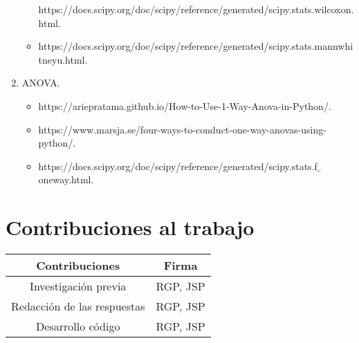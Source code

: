 \documentclass[12pt]{article}
\providecommand{\tightlist}{%
  \setlength{\itemsep}{0pt}\setlength{\parskip}{0pt}}
\begin{document}
\begin{enumerate}
\begin{itemize}
  \text https://docs.scipy.org/doc/scipy/reference/generated/scipy.stats.wilcoxon.html.\\ 
 \item
  \text https://docs.scipy.org/doc/scipy/reference/generated/scipy.stats.mannwhitneyu.html.\\ 
\end{itemize}
\item
ANOVA.\\
\begin{itemize}
\tightlist
\item
  \text https://ariepratama.github.io/How-to-Use-1-Way-Anova-in-Python/.\\
\item
  \text https://www.marsja.se/four-ways-to-conduct-one-way-anovas-using-python/.\\ 
 \item
  \text https://docs.scipy.org/doc/scipy/reference/generated/scipy.stats.f$\_$oneway.html.\\ 
\end{itemize}


\end{enumerate}

\hypertarget{contribuciones}{%
\section{Contribuciones al trabajo}\label{contribuciones}}
\begin{tabular}{| c | c |}
\hline
Contribuciones & Firma \\ \hline
Investigación previa & RGP, JSP \\
Redacción de las respuestas & RGP, JSP \\
Desarrollo código & RGP, JSP \\ \hline
\end{tabular}
\end{document}
